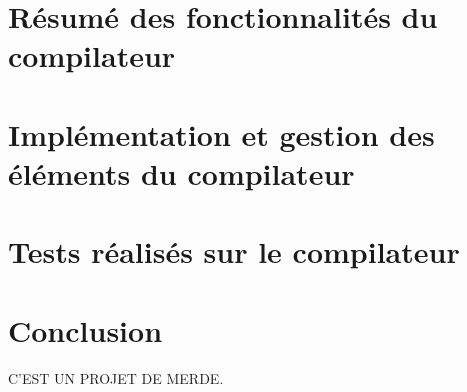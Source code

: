 \documentclass[a4paper,12pt]{article}
\begin{document}
\tableofcontents

\newpage

\section{Résumé des fonctionnalités du compilateur}

\section{Implémentation et gestion des éléments du compilateur}

\section{Tests réalisés sur le compilateur}

\section{Conclusion}
C'EST UN PROJET DE MERDE.
\end{document}
